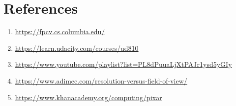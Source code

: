 \documentclass{../template/texnote}
\begin{document}

\section*{References}

\begin{enumerate}
    \item \url{    https://fpcv.cs.columbia.edu/}
\item \url{https://learn.udacity.com/courses/ud810}
\item \url{https://www.youtube.com/playlist?list=PL8dPuuaLjXtPAJr1ysd5yGIy}
\item \url{https://www.adimec.com/resolution-versus-field-of-view/}
\item \url{https://www.khanacademy.org/computing/pixar}
\end{enumerate}
    \printbibliography
\end{document}
